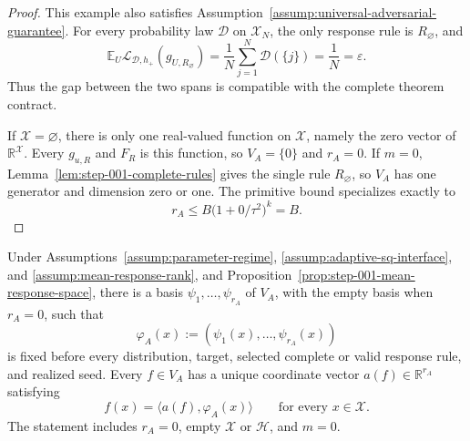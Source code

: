 \begin{proof}
This example also satisfies Assumption~\ref{assump:universal-adversarial-guarantee}.
For every probability law \(\mathcal D\) on \(\mathcal X_N\), the only
response rule is \(R_\varnothing\), and
\[
\mathbb E_U\mathcal L_{\mathcal D,h_+}(g_{U,R_\varnothing})
=\frac1N\sum_{j=1}^N\mathcal D(\{j\})
=\frac1N=\varepsilon.
\]
Thus the gap between the two spans is compatible with the complete theorem
contract.

If \(\mathcal X=\varnothing\), there is only one real-valued function on
\(\mathcal X\), namely the zero vector of \(\mathbb R^{\mathcal X}\).
Every \(g_{u,R}\) and \(F_R\) is this function, so \(V_A=\{0\}\) and
\(r_A=0\).  If \(m=0\), Lemma~\ref{lem:step-001-complete-rules} gives the
single rule \(R_\varnothing\), so \(V_A\) has one generator and dimension
zero or one.  The primitive bound specializes exactly to
\[
r_A\le B\bigl(1+0/\tau^2\bigr)^k=B.
\]
\end{proof}

\begin{proposition}
\label{prop:step-001-fixed-coordinates}
Under Assumptions~\ref{assump:parameter-regime},
\ref{assump:adaptive-sq-interface}, and
\ref{assump:mean-response-rank}, and
Proposition~\ref{prop:step-001-mean-response-space}, there is a basis
\(\psi_1,\ldots,\psi_{r_A}\) of \(V_A\), with the empty basis when
\(r_A=0\), such that
\[
\varphi_A(x):=(\psi_1(x),\ldots,\psi_{r_A}(x))
\]
is fixed before every distribution, target, selected complete or valid
response rule, and realized seed.  Every \(f\in V_A\) has a unique coordinate
vector \(a(f)\in\mathbb R^{r_A}\) satisfying
\[
f(x)=\langle a(f),\varphi_A(x)\rangle
\qquad\text{for every }x\in\mathcal X.
\]
The statement includes \(r_A=0\), empty \(\mathcal X\) or \(\mathcal H\),
and \(m=0\).
\end{proposition}

